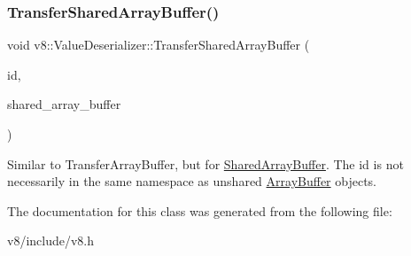 \subsubsection{\texorpdfstring{Transfer\+Shared\+Array\+Buffer()}{TransferSharedArrayBuffer()}}
{\footnotesize\ttfamily void v8\+::\+Value\+Deserializer\+::\+Transfer\+Shared\+Array\+Buffer (\begin{DoxyParamCaption}\item[{uint32\+\_\+t}]{id,  }\item[{\mbox{\hyperlink{classv8_1_1Local}{Local}}$<$ \mbox{\hyperlink{classv8_1_1SharedArrayBuffer}{Shared\+Array\+Buffer}} $>$}]{shared\+\_\+array\+\_\+buffer }\end{DoxyParamCaption})}

Similar to Transfer\+Array\+Buffer, but for \mbox{\hyperlink{classv8_1_1SharedArrayBuffer}{Shared\+Array\+Buffer}}. The id is not necessarily in the same namespace as unshared \mbox{\hyperlink{classv8_1_1ArrayBuffer}{Array\+Buffer}} objects. 

The documentation for this class was generated from the following file\+:\begin{DoxyCompactItemize}
\item 
v8/include/v8.\+h\end{DoxyCompactItemize}
